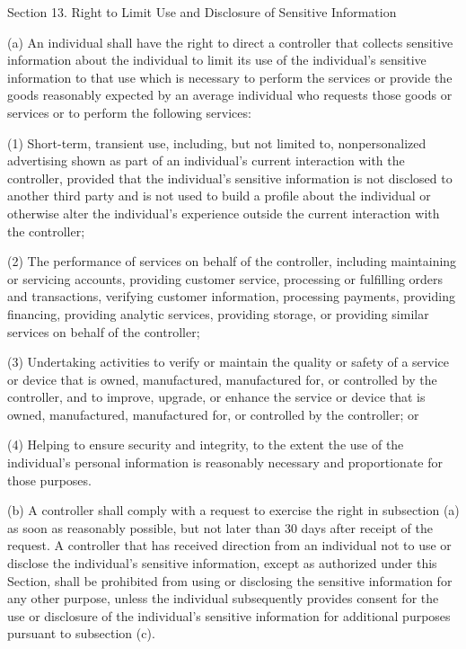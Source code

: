Section 13. Right to Limit Use and Disclosure of Sensitive Information

(a) An individual shall have the right to direct a controller that collects sensitive information about the individual to limit its use of the individual’s sensitive information to that use which is necessary to perform the services or provide the goods reasonably expected by an average individual who requests those goods or services or to perform the following services:

(1) Short-term, transient use, including, but not limited to, nonpersonalized advertising shown as part of an individual’s current interaction with the controller, provided that the individual’s sensitive information is not disclosed to another third party and is not used to build a profile about the individual or otherwise alter the individual’s experience outside the current interaction with the controller;

(2) The performance of services on behalf of the controller, including maintaining or servicing accounts, providing customer service, processing or fulfilling orders and transactions, verifying customer information, processing payments, providing financing, providing analytic services, providing storage, or providing similar services on behalf of the controller;

(3) Undertaking activities to verify or maintain the quality or safety of a service or device that is owned, manufactured, manufactured for, or controlled by the controller, and to improve, upgrade, or enhance the service or device that is owned, manufactured, manufactured for, or controlled by the controller; or

(4) Helping to ensure security and integrity, to the extent the use of the individual’s personal information is reasonably necessary and proportionate for those purposes.

(b) A controller shall comply with a request to exercise the right in subsection (a) as soon as reasonably possible, but not later than 30 days after receipt of the request. A controller that has received direction from an individual not to use or disclose the individual’s sensitive information, except as authorized under this Section, shall be prohibited from using or disclosing the sensitive information for any other purpose, unless the individual subsequently provides consent for the use or disclosure of the individual’s sensitive information for additional purposes pursuant to subsection (c).

